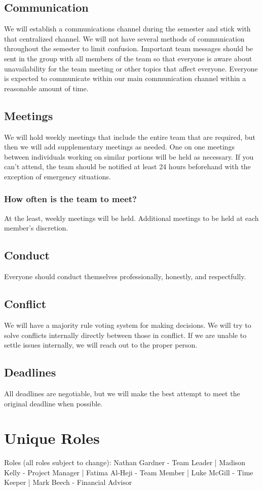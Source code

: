 \documentclass[conference]{IEEEtran}
\begin{document}
\subsection{Communication}
We will establish a communications channel during the semester and stick with that centralized channel. We will not have several methods of communication throughout the semester to limit confusion. Important team messages should be sent in the group with all members of the team so that everyone is aware about unavailability for the team meeting or other topics that affect everyone. Everyone is expected to communicate within our main communication channel within a reasonable amount of time.
\subsection{Meetings}
We will hold weekly meetings that include the entire team that are required, but then we will add supplementary meetings as needed. One on one meetings between individuals working on similar portions will be held as necessary. If you can't attend, the team should be notified at least 24 hours beforehand with the exception of emergency situations. 
\subsubsection{How often is the team to meet?}
At the least, weekly meetings will be held. Additional meetings to be held at each member's discretion.
\subsection{Conduct}
Everyone should conduct themselves professionally, honestly, and respectfully. 
\subsection{Conflict}
We will have a majority rule voting system for making decisions. We will try to solve conflicts internally directly between those in conflict. If we are unable to settle issues internally, we will reach out to the proper person.
\subsection{Deadlines}
All deadlines are negotiable, but we will make the best attempt to meet the original deadline when possible. 
\section{Unique Roles}
Roles (all roles subject to change):
Nathan Gardner - Team Leader | Madison Kelly - Project Manager |  Fatima Al-Heji - Team Member | Luke McGill - Time Keeper | Mark Beech - Financial Advisor
\end{document}
